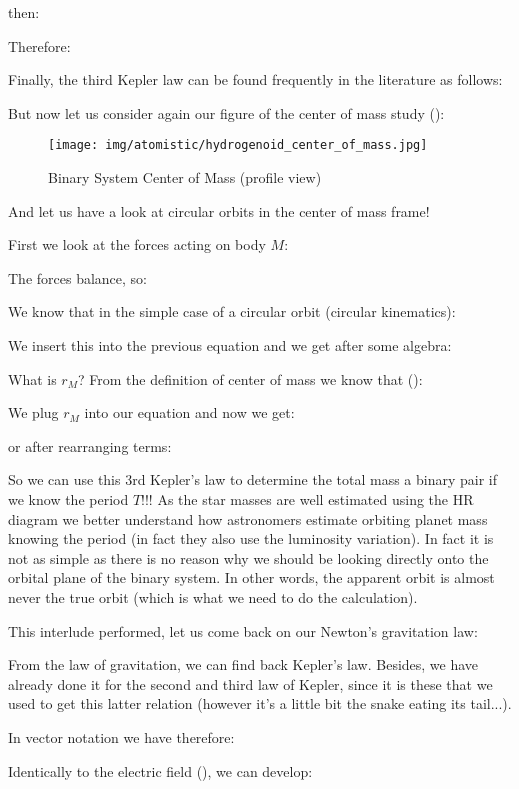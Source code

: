 	then:
	
	Therefore:
	
	Finally, the third Kepler law can be found frequently in the literature as follows:
	
	But now let us consider again our figure of the center of mass study ():
	\begin{figure}[H]
		\centering
		\texttt{[image: img/atomistic/hydrogenoid\_center\_of\_mass.jpg]}
		\caption[]{Binary System Center of Mass (profile view)}
	\end{figure}
	And let us have a look at circular orbits in the center of mass frame! 
	
	First we look at the forces acting on body $M$:
	
	The forces balance, so:
	
	We know that in the simple case of a circular orbit (circular kinematics):
	
	We insert this into the previous equation and we get after some algebra:
	
	What is $r_M$? From the definition of center of mass we know that ():
	
	We plug $r_M$ into our equation and now we get:
	
	or after rearranging terms:
	
	So we can use this 3rd Kepler's law to determine the total mass a binary pair if we know the period $T$!!! As the star masses are well estimated using the HR diagram we better understand how astronomers estimate orbiting planet mass knowing the period (in fact they also use the luminosity variation). In fact it is not as simple as there is no reason why we should be looking directly onto the orbital plane of the binary system. In other words, the apparent orbit is almost never the true orbit (which is what we need to do the calculation).
	
	This interlude performed, let us come back on our Newton's gravitation law:
	
	From the law of gravitation, we can find back Kepler's law. Besides, we have already done it for the second and third law of Kepler, since it is these that we used to get this latter relation (however it's a little bit the snake eating its tail...).
	
	In vector notation we have therefore:
	
	Identically to the electric field (), we can develop:
	
